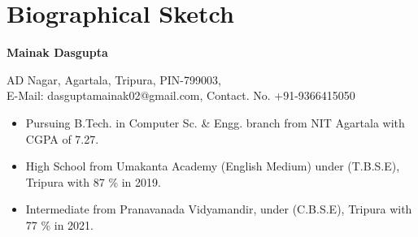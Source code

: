 \documentclass[USenglish,a4paper,12pt]{nitathesis}
\numberwithin{figure}{chapter}
\begin{document}
\chapter{Biographical Sketch}
\begin{center}
{\textbf{\large Mainak Dasgupta }}\end{center} %
\begin{center}
AD Nagar, Agartala, Tripura, PIN-799003,\\ E-Mail: dasguptamainak02@gmail.com,  Contact. No. +91-9366415050 \\
 \end{center}
 \begin{itemize}
  \setlength\itemsep{0pt}
\item Pursuing B.Tech. in Computer Sc. \& Engg. branch from NIT Agartala with CGPA of 7.27.
\item High School from Umakanta Academy (English Medium) under (T.B.S.E), Tripura with 87 \% in 2019.
\item Intermediate from Pranavanada Vidyamandir, under (C.B.S.E), Tripura with 77 \% in 2021.
\end{itemize}
\end{document}
